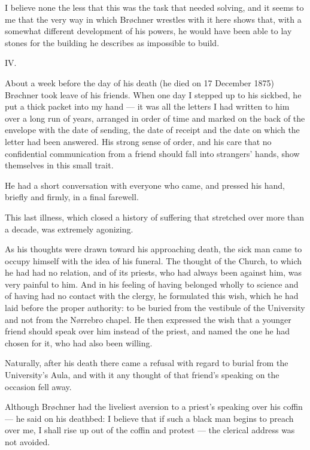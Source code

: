 \documentclass[12pt,a4paper,openany]{book}
\newcommand{\opage}[1]{\marginnote{\footnotesize\textit{[#1]}}}
\newcommand{\sectionnum}[1]{\begin{center}#1\end{center}}
\begin{document}
I believe none the less that this was the task that needed solving, and it
seems to me that the very way in which Brøchner wrestles with it here shows
that, with a somewhat different development of his powers, he would have been
able to lay stones for the building he describes as impossible to build.

\sectionnum{IV.}

About a week before the day of his death (he died on 17 December 1875)
Brøchner took leave of his friends. When one day I stepped up to his sickbed, he
put a thick packet into my hand --- it was all the letters I had written to him
over a long run of years, arranged in order of time
\opage{253}and marked on the back of the envelope with the date of sending, the date of
receipt and the date on which the letter had been answered. His strong sense of
order, and his care that no confidential communication from a friend should
fall into strangers' hands, show themselves in this small trait.

He had a short conversation with everyone who came, and pressed his hand,
briefly and firmly, in a final farewell.

This last illness, which closed a history of suffering that stretched over
more than a decade, was extremely agonizing.

As his thoughts were drawn toward his approaching death, the sick man came to
occupy himself with the idea of his funeral. The thought of the Church, to
which he had had no relation, and of its priests, who had always been against
him, was very painful to him. And in his feeling of having belonged wholly to
science and of having had no contact with the clergy, he formulated this wish,
which he had laid before the proper authority: to be buried from the vestibule
of the University and not from the Nørrebro chapel. He then expressed the wish
that a younger friend should speak over him instead of the priest, and named
the one he had chosen for it, who had also been willing.

Naturally, after his death there came a
\opage{254}refusal with regard to burial from the University's Aula, and with it any
thought of that friend's speaking on the occasion fell away.

Although Brøchner had the liveliest aversion to a priest's speaking over his
coffin --- he said on his deathbed: I believe that if such a black man begins to
preach over me, I shall rise up out of the coffin and protest --- the clerical
address was not avoided.
\end{document}
